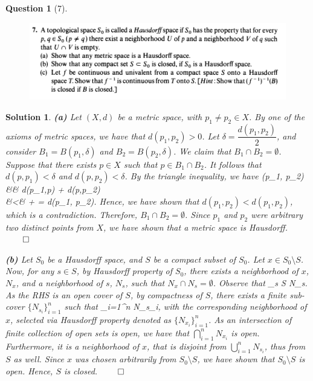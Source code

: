 \documentclass{article} %
\def\eQb#1\eQe{\begin{eqnarray*}#1\end{eqnarray*}}
\theoremstyle{quest}
\newtheorem*{question}{Question}
\newtheorem*{solution}{Solution}
\begin{document}
\begin{question}[7]
\hfill
\begin{figure}[h!]
  \centering
    \includegraphics[width=1\textwidth]{MA-2-29-7.png}
\end{figure}
\end{question}
\begin{solution} 
\textbf{(a)}
Let $(X,d)$ be a metric space, with $p_1 \neq p_2 \in X$. By one of the axioms of 
metric spaces, we have that $d(p_1, p_2) > 0$. Let $\delta = \dfrac{d(p_1, p_2)}{2}$,
and consider $B_1 = B(p_1,\delta)$ and $B_2 = B(p_2,\delta)$. We claim that $B_1 \cap
B_2 =\emptyset$. Suppose that there exists $p \in X$ such that $p \in B_1 \cap B_2$.
It follows that $d(p,p_1) < \delta$ and $d(p,p_2) < \delta$. By the triangle inequality,
we have
\eQb
d(p_1, p_2) &\leq& d(p_1,p) + d(p,p_2) \\
&<& \delta + \delta = d(p_1, p_2).
\eQe  
Hence, we have shown that $d(p_1, p_2) < d(p_1, p_2)$, which is a contradiction. 
Therefore, $B_1 \cap B_2 = \emptyset$. Since $p_1$ and $p_2$ were arbitrary two
distinct points from $X$, we have shown that a metric space is Hausdorff. 
\hfill $\qed$

\bigskip

\textbf{(b)}
Let $S_0$ be a Hausdorff space, and $S$ be a compact subset of $S_0$.
Let $x \in S_0 \setminus S$. Now, for any $s \in S$, by Hausdorff property 
of $S_0$, there exists a neighborhood of $x$, $N_x$, and a neighborhood of $s$, $N_s$,
such that $N_x \cap N_s = \emptyset$. Observe that 
\eQb
S \subset \bigcup_{s \in S} N_s.
\eQe  
As the RHS is an open cover of $S$, by compactness of $S$, there exists a finite
sub-cover $\{N_{s_i}\}_{i=1}^{n}$ such that 
\eQb
S \subset \bigcup_{i=1}^{n} N_{s_i},
\eQe
with the corresponding neighborhood of $x$, selected via Hausdorff property
denoted as $\{ N_{x_i} \}_{i=1}^{n}$. As an intersection of finite collection
of open sets is open, we have that $\bigcap_{i=1}^{n} N_{x_i}$ is open. Furthermore,
it is a neighborhood of $x$, that is disjoint from $\bigcup_{i=1}^{n} N_{s_i}$,
thus from $S$ as well. Since $x$ was chosen arbitrarily from $S_0 \setminus S$, we have
shown that $S_0 \setminus S$ is open. Hence, $S$ is closed.
\hfill $\qed$


\end{solution}
\end{document}
